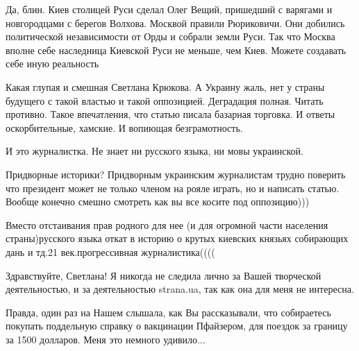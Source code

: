 \begin{itemize}
Да, блин. Киев столицей Руси сделал Олег Вещий, пришедший с варягами и
новгородцами с берегов Волхова. Москвой правили Рюриковичи. Они добились
политической независимости от Орды и собрали земли Руси. Так что Москва вполне
себе наследница Киевской Руси не меньше, чем Киев. Можете создавать себе иную
реальность

 

Какая глупая и смешная Светлана Крюкова. А Украину жаль, нет у страны будущего
с такой властью и такой оппозицией. Деградация полная. Читать противно. Такое
впечатления, что статью писала базарная торговка. И ответы оскорбительные,
хамские. И вопиющая безграмотность. 

И это журналистка. Не знает ни русского языка, ни мовы украинской.


 

Придворные историки? Придворным украинским журналистам трудно поверить что
президент может не только членом на рояле играть, но и написать статью. Вообще
конечно смешно смотреть как вы все косите под оппозицию)))

 

Вместо отстаивания прав родного для нее (и для огромной части населения
страны)русского языка откат в историю о крутых киевских князьях собирающих дань
и тд.21 век.прогрессивная журналистика((((


Здравствуйте, Светлана! Я никогда не следила лично за Вашей творческой
деятельностью, и за деятельностью strana.ua, так как она для меня не интересна.

Правда, один раз на Нашем слышала, как Вы рассказывали, что собираетесь
покупать поддельную справку о вакцинации Пфайзером, для поездок за границу за
1500 долларов. Меня это немного удивило... 


\end{itemize}
